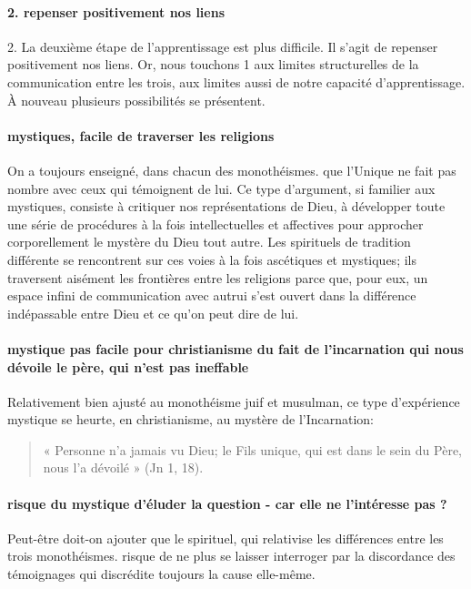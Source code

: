 \paragraph{2. repenser positivement nos liens}
2. La deuxième étape de l'apprentissage est plus difficile.
Il s'agit de repenser positivement nos liens. Or, nous touchons 1 aux limites structurelles de la communication entre les trois, aux limites aussi de notre capacité d'apprentissage.
À nouveau plusieurs possibilités se présentent.

\paragraph{mystiques, facile de traverser les religions} On a toujours enseigné, dans chacun des monothéismes. que l'Unique ne fait pas nombre avec ceux qui témoignent de lui. Ce type d'argument, si familier aux mystiques, consiste à critiquer nos représentations de Dieu, à développer toute une série de procédures à la fois intellectuelles et affectives pour approcher corporellement le mystère du Dieu tout autre. Les spirituels de tradition différente se rencontrent sur ces voies à la fois ascétiques et mystiques; ils traversent aisément les frontières entre les religions parce que, pour eux, un espace infini de communication avec autrui s'est ouvert dans la différence indépassable entre Dieu et ce qu'on peut dire de lui.

\paragraph{mystique pas facile pour christianisme du fait de l'incarnation qui nous dévoile le père, qui n'est pas ineffable}
Relativement bien ajusté au monothéisme juif et musulman, ce type d'expérience mystique se heurte, en christianisme, au mystère de l'Incarnation: \begin{quote}
    « Personne n'a jamais vu Dieu; le Fils unique, qui est dans le sein du Père, nous l'a dévoilé » (Jn 1, 18).
\end{quote} 

\paragraph{risque du mystique d'éluder la question - car elle ne l'intéresse pas ? }Peut-être doit-on ajouter que le spirituel, qui relativise les différences entre les trois monothéismes. risque de ne plus se laisser interroger par la discordance des témoignages qui discrédite toujours la cause elle-même.

